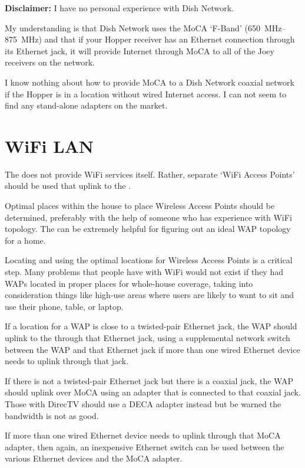 \textbf{Disclaimer:} I have no personal experience with Dish Network.

My understanding is that Dish Network uses the MoCA `F-Band' (\SIrange{650}{875}{\mega\hertz}) and that if your Hopper
receiver has an Ethernet connection through its Ethernet jack, it will provide Internet through MoCA to all of
the Joey receivers on the network.

I know nothing about how to provide MoCA to a Dish Network coaxial network if the Hopper is in a location without
wired Internet access. I can not seem to find any stand-alone \fband{} adapters on the market.



\section{WiFi LAN}
\label{apx:router:wifi}

The  does not provide WiFi services itself. Rather, separate `WiFi Access Points'
should be used that uplink to the .

Optimal places within the house to place Wireless Access Points should be determined, preferably with the
help of someone who has experience with WiFi topology. The
 can be extremely helpful for
figuring out an ideal WAP topology for a home.

Locating and using the optimal locations for Wireless Access Points is a critical step. Many problems that
people have with WiFi would not exist if they had WAPs located in proper places for whole-house coverage,
taking into consideration things like high-use areas where users are likely to want to sit and use their
phone, table, or laptop.

If a location for a WAP is close to a twisted-pair Ethernet jack, the WAP should uplink to the
 through that Ethernet jack, using a supplemental network switch between
the WAP and that Ethernet jack if more than one wired Ethernet device needs to uplink through that jack.

If there is not a twisted-pair Ethernet jack but there is a coaxial jack, the WAP should uplink over MoCA
using an \xdband{} adapter that is connected to that coaxial jack. Those with DirecTV should use a DECA
\eband{} adapter instead but be warned the bandwidth is not as good.

If more than one wired Ethernet device needs to uplink through that MoCA adapter, then again, an inexpensive
Ethernet switch can be used between the various Ethernet devices and the MoCA adapter.

